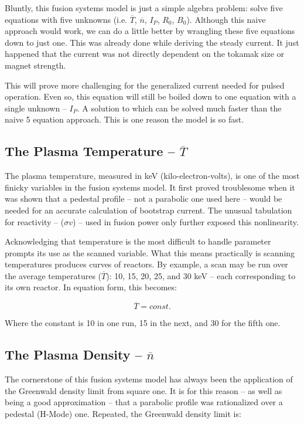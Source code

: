 \documentclass[11pt]{book}
\begin{document}
Bluntly, this fusion systems model is just a simple algebra problem: solve five equations with five unknowns (i.e. $\overline T$, $\overline n$, $I_P$, $R_0$, $B_0$). Although this naive approach would work, we can do a little better by wrangling these five equations down to just one. This was already done while deriving the steady current. It just happened that the current was not directly dependent on the tokamak size or magnet strength. 

This will prove more challenging for the generalized current needed for pulsed operation. Even so, this equation will still be boiled down to one equation with a single unknown -- $I_P$. A solution to which can be solved much faster than the naive 5 equation approach. This is one reason the model is so fast. 

\subsection{The Plasma Temperature -- $\overline T$}

The plasma temperature, measured in keV (kilo-electron-volts), is one of the most finicky variables in the fusion systems model. It first proved troublesome when it was shown that a pedestal profile -- not a parabolic one used here -- would be needed for an accurate calculation of bootstrap current. The unusual tabulation for reactivity -- ($\sigma v$) -- used in fusion power only further exposed this nonlinearity.

Acknowledging that temperature is the most difficult to handle parameter prompts its use as the scanned variable. What this means practically is scanning temperatures produces curves of reactors. By example, a scan may be run over the average temperatures ($\overline T$): 10, 15, 20, 25, and 30 keV -- each corresponding to its own reactor. In equation form, this becomes:

\begin{equation}
	\label{eq:tbar}
	\overline T = const.
\end{equation}

Where the constant is 10 in one run, 15 in the next, and 30 for the fifth one.

\subsection{The Plasma Density -- $\overline n$}

The cornerstone of this fusion systems model has always been the application of the Greenwald density limit from square one. It is for this reason -- as well as being a good approximation -- that a parabolic profile was rationalized over a pedestal (H-Mode) one. Repeated, the Greenwald density limit is:
\end{document}
